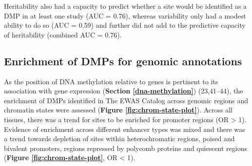 \documentclass[11pt,twoside]{bristolthesis}
\begin{document}
Heritability also had a capacity to predict whether a site would be identified as a DMP in at least one study (AUC = 0.76), whereas variability only had a modest ability to do so (AUC = 0.59) and further did not add to the predictive capacity of heritability (combined AUC = 0.76).

\hypertarget{dmp-enrichment-results}{%
\subsection{Enrichment of DMPs for genomic annotations}\label{dmp-enrichment-results}}

As the position of DNA methylation relative to genes is pertinent to its association with gene expression (\textbf{Section \ref{dna-methylation}}) (23,41--44), the enrichment of DMPs identified in The EWAS Catalog across genomic regions and chromatin states were assessed (\textbf{Figure \ref{fig:chrom-state-plot}}). Across all tissues, there was a trend for sites to be enriched for promoter regions (OR \textgreater{} 1). Evidence of enrichment across different enhancer types was mixed and there was a trend towards depletion of sites within heterochromatic regions, poised and bivalent promoters, regions repressed by polycomb proteins and quiescent regions (\textbf{Figure \ref{fig:chrom-state-plot}}, OR \textless{} 1).
\end{document}
